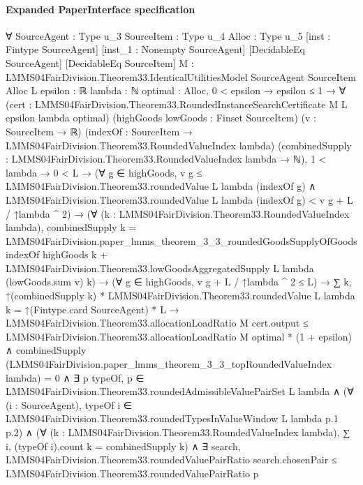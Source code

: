 \documentclass[10pt]{article}
\begin{document}
\paragraph{Expanded PaperInterface specification}
\begin{ReviewVerbatim}
∀ {SourceAgent : Type u_3} {SourceItem : Type u_4} {Alloc : Type u_5} [inst : Fintype SourceAgent]
  [inst_1 : Nonempty SourceAgent] [DecidableEq SourceAgent] [DecidableEq SourceItem]
  {M : LMMS04FairDivision.Theorem33.IdenticalUtilitiesModel SourceAgent SourceItem Alloc} {L epsilon : ℝ} {lambda : ℕ}
  {optimal : Alloc},
  0 < epsilon →
    epsilon ≤ 1 →
      ∀ (cert : LMMS04FairDivision.Theorem33.RoundedInstanceSearchCertificate M L epsilon lambda optimal)
        (highGoods lowGoods : Finset SourceItem) (v : SourceItem → ℝ)
        (indexOf : SourceItem → LMMS04FairDivision.Theorem33.RoundedValueIndex lambda)
        (combinedSupply : LMMS04FairDivision.Theorem33.RoundedValueIndex lambda → ℕ),
        1 < lambda →
          0 < L →
            (∀ g ∈ highGoods,
                v g ≤ LMMS04FairDivision.Theorem33.roundedValue L lambda (indexOf g) ∧
                  LMMS04FairDivision.Theorem33.roundedValue L lambda (indexOf g) < v g + L / ↑lambda ^ 2) →
              (∀ (k : LMMS04FairDivision.Theorem33.RoundedValueIndex lambda),
                  combinedSupply k =
                    LMMS04FairDivision.paper_lmms_theorem_3_3_roundedGoodsSupplyOfGoods indexOf highGoods k +
                      LMMS04FairDivision.Theorem33.lowGoodsAggregatedSupply L lambda (lowGoods.sum v) k) →
                (∀ g ∈ highGoods, v g + L / ↑lambda ^ 2 ≤ L) →
                  ∑ k, ↑(combinedSupply k) * LMMS04FairDivision.Theorem33.roundedValue L lambda k =
                      ↑(Fintype.card SourceAgent) * L →
                    LMMS04FairDivision.Theorem33.allocationLoadRatio M cert.output ≤
                        LMMS04FairDivision.Theorem33.allocationLoadRatio M optimal * (1 + epsilon) ∧
                      combinedSupply (LMMS04FairDivision.paper_lmms_theorem_3_3_topRoundedValueIndex lambda) = 0 ∧
                        ∃ p typeOf,
                          p ∈ LMMS04FairDivision.Theorem33.roundedAdmissibleValuePairSet L lambda ∧
                            (∀ (i : SourceAgent),
                                typeOf i ∈ LMMS04FairDivision.Theorem33.roundedTypesInValueWindow L lambda p.1 p.2) ∧
                              (∀ (k : LMMS04FairDivision.Theorem33.RoundedValueIndex lambda),
                                  ∑ i, (typeOf i).count k = combinedSupply k) ∧
                                ∃ search,
                                  LMMS04FairDivision.Theorem33.roundedValuePairRatio search.chosenPair ≤
                                    LMMS04FairDivision.Theorem33.roundedValuePairRatio p
\end{ReviewVerbatim}
\end{document}
